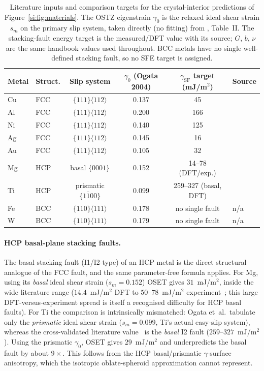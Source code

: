 \documentclass[11pt]{article}
\newcommand{\g}{\gamma_0}
\begin{document}
\begin{table}[htbp]
\centering
\caption{Literature inputs and comparison targets for the
crystal-interior predictions of Figure~\ref{si:fig:materials}. The OSTZ
eigenstrain $\g$ is the relaxed ideal shear strain $s_m$ on the primary
slip system, taken directly (no fitting) from
\citet{S_ogata2004}, Table~II. The stacking-fault energy
target is the measured/DFT value with its source; $G$, $b$, $\nu$ are
the same handbook values used throughout. BCC metals have no single
well-defined stacking fault, so no SFE target is assigned.}
\label{si:tab:sfe}
\begin{tabular}{llccc l}
\toprule
Metal & Struct. & Slip system & $\g$ (Ogata 2004) & $\gamma_\text{SF}$ target (mJ/m$^2$) & Source \\
\midrule
Cu & FCC & $\{111\}\langle112\rangle$ & 0.137 & 45  & \citep{S_gallagher1970}\\
Al & FCC & $\{111\}\langle112\rangle$ & 0.200 & 166 & \citep{S_gallagher1970}\\
Ni & FCC & $\{111\}\langle112\rangle$ & 0.140 & 125 & \citep{S_gallagher1970}\\
Ag & FCC & $\{111\}\langle112\rangle$ & 0.145 & 16  & \citep{S_gallagher1970}\\
Au & FCC & $\{111\}\langle112\rangle$ & 0.105 & 32  & \citep{S_gallagher1970}\\
Mg & HCP & basal $\{0001\}$           & 0.152 & 14--78 (DFT/exp.) & \citep{S_wang2014mg}\\
Ti & HCP & prismatic $\{1\bar100\}$   & 0.099 & 259--327 (basal, DFT) & \citep{S_yu2016ti}\\
Fe & BCC & $\{110\}\langle111\rangle$ & 0.178 & no single fault & n/a\\
W  & BCC & $\{110\}\langle111\rangle$ & 0.179 & no single fault & n/a\\
\bottomrule
\end{tabular}
\end{table}

\paragraph{HCP basal-plane stacking faults.}
The basal stacking fault (I1/I2-type) of an HCP metal is the direct
structural analogue of the FCC fault, and the same parameter-free
formula applies. For Mg, using its \emph{basal} ideal shear strain
($s_m=0.152$) OSET gives $31$~mJ/m$^2$, inside the wide literature
range ($14.4$~mJ/m$^2$ DFT to $50$--$78$~mJ/m$^2$
experiment~\citep{S_wang2014mg}; this large DFT-versus-experiment spread
is itself a recognised difficulty for HCP basal faults). For Ti the
comparison is intrinsically mismatched: Ogata et~al.\ tabulate only the
\emph{prismatic} ideal shear strain ($s_m=0.099$, Ti's actual easy-slip
system), whereas the cross-validated literature value~\citep{S_yu2016ti}
is the \emph{basal} I2 fault ($259$--$327$~mJ/m$^2$). Using the
prismatic $\g$, OSET gives $29$~mJ/m$^2$ and underpredicts the basal
fault by about $9\times$. This follows from the HCP basal/prismatic
$\gamma$-surface anisotropy, which the isotropic oblate-spheroid
approximation cannot represent.
\end{document}
